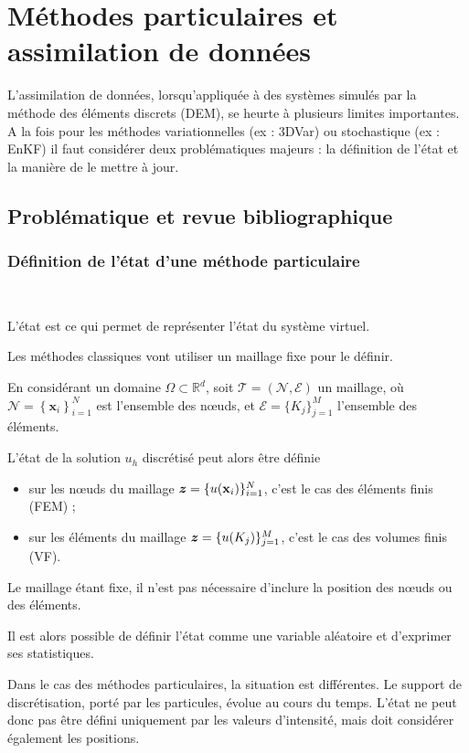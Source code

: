 \chapter{Méthodes particulaires et assimilation de données}

L'assimilation de données, lorsqu'appliquée à des systèmes simulés par la méthode des éléments discrets (DEM), se heurte à plusieurs limites importantes. A la fois pour les méthodes variationnelles (ex : 3DVar) ou stochastique (ex : EnKF) il faut considérer deux problématiques majeurs : la définition de l'état et la manière de le mettre à jour.

\section{Problématique et revue bibliographique}

\subsection{Définition de l'état d'une méthode particulaire}~\label{sec:etat_meshless}

L'état est ce qui permet de représenter l'état du système virtuel.

Les méthodes classiques vont utiliser un maillage fixe pour le définir.

En considérant un domaine $\Omega \subset \mathbb R^d$, soit $\mathcal{T} = (\mathcal N, \mathcal E)$ un maillage, où $\mathcal N = \left\{\bm x_i \right\}^N_{i=1}$ est l'ensemble des nœuds, et $\mathcal{E} = \{ K_j \}_{j=1}^{M}$ l'ensemble des éléments.

L'état de la solution \(u_h\) discrétisé peut alors être définie

\begin{itemize}
    \item sur les nœuds du maillage $\bm z = \{ u(\mathbf{x}_i) \}_{i=1}^{N}$, c'est le cas des éléments finis (FEM) ;
    \item  sur les éléments du maillage $\bm z = \{ u(K_j) \}_{j=1}^{M}$, c'est le cas des volumes finis (VF).
\end{itemize}

Le maillage étant fixe, il n'est pas nécessaire d'inclure la position des nœuds ou des éléments.

Il est alors possible de définir l'état comme une variable aléatoire et d'exprimer ses statistiques.

Dans le cas des méthodes particulaires, la situation est différentes. Le support de discrétisation, porté par les particules, évolue au cours du temps. L'état ne peut donc pas être défini uniquement par les valeurs d'intensité, mais doit considérer également les positions.

